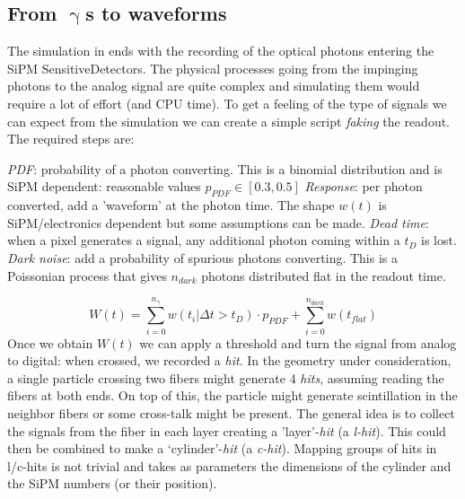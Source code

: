 \begin{refsection}
    \subsection{From $\upgamma$s to waveforms}
        The simulation in \gf ends with the recording of the optical photons entering the SiPM SensitiveDetectors.
        The physical processes going from the impinging photons to the analog signal are quite complex and simulating them would require a lot of effort (and CPU time).
        To get a feeling of the type of signals we can expect from the simulation we can create a simple script \textit{faking} the readout.
        The required steps are:
        \begin{outline}
            \1 \textit{PDF}: probability of a photon converting. 
            This is a binomial distribution and is SiPM dependent: reasonable values $p_{PDF}\in [0.3, 0.5]$
            \1 \textit{Response}: per photon converted, add a 'waveform' at the photon time. 
            The shape $w(t)$ is SiPM/electronics dependent but some assumptions can be made.
            \1 \textit{Dead time}: when a pixel generates a signal, any additional photon coming within a $t_D$ is lost.
            \1 \textit{Dark noise}: add a probability of spurious photons converting. 
            This is a Poissonian process that gives $n_{dark}$ photons distributed flat in the readout time.
        \end{outline}
        \begin{equation}
            W(t)=\sum_{i=0}^{n_\gamma} w(t_i|\Delta t>t_D)\cdot p_{PDF} + \sum_{i=0}^{n_{dark}} w(t_{flat}) 
        \end{equation}
        Once we obtain $W(t)$ we can apply a threshold and turn the signal from analog to digital: when crossed, we recorded a \textit{hit}.
        In the geometry under consideration, a single particle crossing two fibers might generate 4 \textit{hits}, assuming reading the fibers at both ends.
        On top of this, the particle might generate scintillation in the neighbor fibers or some cross-talk might be present. 
        The general idea is to collect the signals from the fiber in each layer creating a 'layer'-\textit{hit} (a \textit{l-hit}). 
        This could then be combined to make a `cylinder'-\textit{hit} (a \textit{c-hit}).
        Mapping groups of hits in l/c-hits is not trivial and takes as parameters the dimensions of the cylinder and the SiPM numbers (or their position).


\end{refsection}
